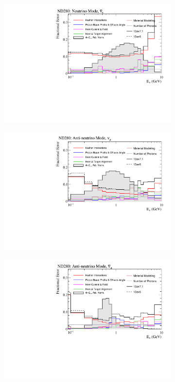 \begin{figure}[!htbp]
\begin{subfigure}{.49\textwidth}
\end{subfigure}
\begin{subfigure}{.49\textwidth}
  \centering
  \includegraphics[width=0.99\linewidth]{figs/flux_error_t2k_nd5_fhc_nuebar}
\end{subfigure}
\begin{subfigure}{.49\textwidth}
  \centering
  \includegraphics[width=0.99\linewidth]{figs/flux_error_t2k_nd5_rhc_numu}
\end{subfigure}
\begin{subfigure}{.49\textwidth}
  \centering
  \includegraphics[width=0.99\linewidth]{figs/flux_error_t2k_nd5_rhc_numubar}

\end{subfigure}
\end{figure}
